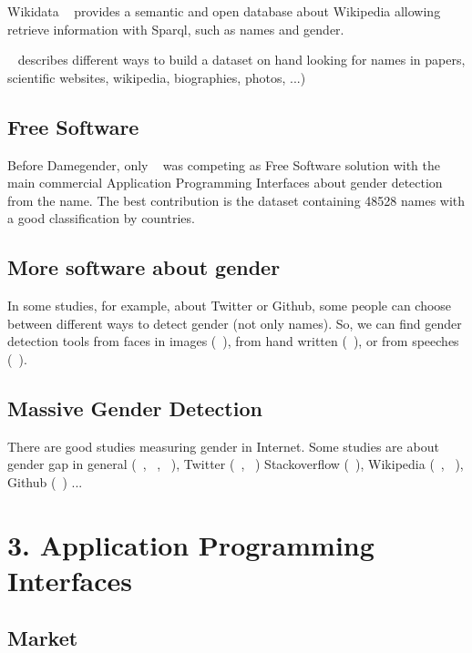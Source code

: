 \documentclass[fleqn,10pt,lineno]{wlpeerj} %
\begin{document}
Wikidata ~\cite{42240} provides a semantic and open database about
Wikipedia allowing retrieve information with Sparql, such as names and
gender.

~\cite{10.7717/peerj-cs.156} describes different ways to build a
dataset on hand looking for names in papers, scientific websites,
wikipedia, biographies, photos, ...)

\subsection*{Free Software}

Before Damegender, only ~\cite{krawetz2006gender} was competing as
Free Software solution with the main commercial Application
Programming Interfaces about gender detection from the name. The best
contribution is the dataset containing 48528 names with a good
classification by countries.

\subsection*{More software about gender}

In some studies, for example, about Twitter or Github, some people can
choose between different ways to detect gender (not only names). So,
we can find gender detection tools from faces in images
(~\cite{ranjan2017hyperface}), from hand written
(~\cite{liwicki2011automatic}), or from speeches
(~\cite{koppel2002automatically}).

\subsection*{Massive Gender Detection}

There are good studies measuring gender in Internet. Some studies are
about gender gap in general (~\cite{robles2014floss},
~\cite{holman2018gender}, ~\cite{dollar1999gender}), Twitter
(~\cite{burger2011discriminating}, ~\cite{mislove2011understanding})
Stackoverflow (~\cite{vasilescu2012gender}), Wikipedia
(~\cite{antin2011gender}, ~\cite{hill2013wikipedia}), Github
(~\cite{vasilescu2015gender}) ...

\section*{3. Application Programming Interfaces}

\subsection*{Market}
\end{document}
